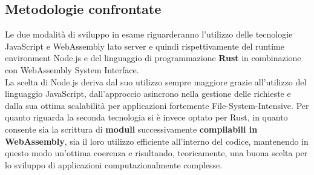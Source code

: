 \subsection{Metodologie confrontate}
Le due modalità di sviluppo in esame riguarderanno l'utilizzo delle tecnologie JavaScript e WebAssembly lato server e quindi rispettivamente del runtime environment Node.js e del linguaggio di programmazione \textbf{Rust} in combinazione con WebAssembly System Interface\cite*{rust:wasm}. 
\\La scelta di Node.js deriva dal suo utilizzo sempre maggiore grazie all'utilizzo del linguaggio JavaScript, dall'approccio asincrono nella gestione delle richieste e dalla sua ottima scalabilità per applicazioni fortemente File-System-Intensive.
Per quanto riguarda la seconda tecnologia si è invece optato per Rust, in quanto consente sia la scrittura di \textbf{moduli} successivamente \textbf{compilabili in WebAssembly}, sia il loro utilizzo efficiente all'interno del codice, mantenendo in questo modo un'ottima coerenza e risultando, teoricamente, una buona scelta per lo sviluppo di applicazioni computazionalmente complesse. 

